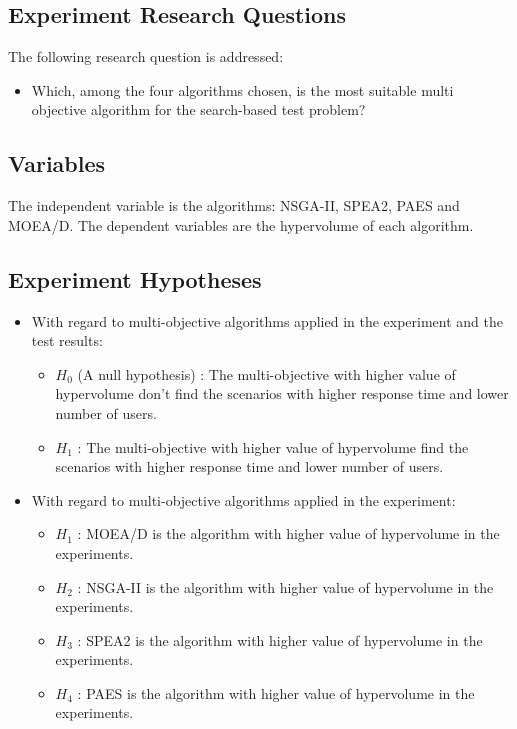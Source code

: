 \documentclass[espaco=umemeio,chapter=TITLE,twoside,openright]{abnt}
\begin{document}
\subsection{Experiment Research Questions}

The following research question is addressed:
\begin{itemize}
\item Which, among the four algorithms chosen, is the most suitable multi objective algorithm for the search-based test problem?
\end{itemize}

\subsection{Variables}

The independent variable is the algorithms: NSGA-II, SPEA2, PAES and MOEA/D. The dependent variables are the hypervolume of each algorithm.

\subsection{Experiment Hypotheses}

\begin{itemize}
\item With regard to multi-objective algorithms applied in the experiment and the test results:
\begin{itemize}
\item $H_{0}$ (A null hypothesis) : The multi-objective with  higher value of hypervolume don't find the scenarios with higher response time and lower number of users.
\item $H_{1}$  : The multi-objective with  higher value of hypervolume find the scenarios with higher response time and lower number of users.
\end{itemize}
\end{itemize}

\begin{itemize}
\item With regard to multi-objective algorithms applied in the experiment:
\begin{itemize}
\item $H_{1}$  : MOEA/D is the algorithm with higher value of hypervolume in the experiments.
\item $H_{2}$  : NSGA-II is the algorithm with higher value of hypervolume in the experiments.
\item $H_{3}$  : SPEA2 is the algorithm with higher value of hypervolume in the experiments.
\item $H_{4}$  : PAES is the algorithm with higher value of hypervolume in the experiments.
\end{itemize}
\end{itemize}
\end{document}
